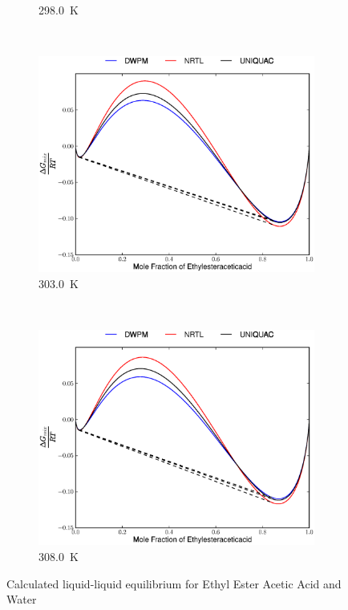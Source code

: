 \begin{figure}[hp]
\begin{subfigure}[h]{0.5\textwidth}
	\caption{298.0~$\mathrm{K}$}
\end{subfigure}%
\\%
\begin{subfigure}[h]{0.5\textwidth}
	\centering
	\includegraphics[width = \textwidth]{Results_Parts/BinaryParams/ethylesteraceticacid-water/AllModelsGibbsPlots/T_303.0.eps}
	\caption{303.0~$\mathrm{K}$}
\end{subfigure}%
~%
\begin{subfigure}[h]{0.5\textwidth}
	\centering
	\includegraphics[width = \textwidth]{Results_Parts/BinaryParams/ethylesteraceticacid-water/AllModelsGibbsPlots/T_308.0.eps}
	\caption{308.0~$\mathrm{K}$}
\end{subfigure}%
\caption[]{Calculated liquid-liquid equilibrium for Ethyl Ester Acetic Acid and Water}
\end{figure}
